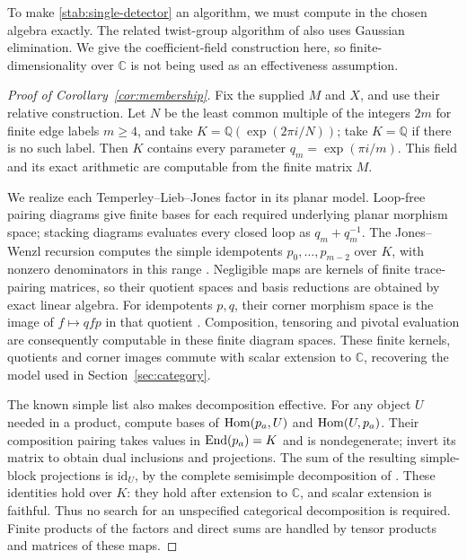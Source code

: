 To make \eqref{stab:single-detector} an algorithm, we must compute in the
chosen algebra exactly. The related twist-group algorithm of
\cite[Proposition~7.11]{HengLicata2024} also uses Gaussian elimination.
We give the coefficient-field construction here, so finite-dimensionality
over $\mathbb C$ is not being used as an effectiveness assumption.

\begin{proof}[Proof of Corollary~\ref{cor:membership}]
Fix the supplied $M$ and $X$, and use their relative construction.
Let $N$ be the least common multiple of the integers $2m$ for finite
edge labels $m\ge4$, and take $K=\mathbb Q(\exp(2\pi i/N))$; take
$K=\mathbb Q$ if there is no such label. Then $K$ contains every
parameter $q_m=\exp(\pi i/m)$. This field and its exact arithmetic are
computable from the finite matrix $M$.

We realize each Temperley--Lieb--Jones factor in its planar model.
Loop-free pairing diagrams give finite bases for each required underlying
planar morphism space; stacking diagrams evaluates every closed loop as $q_m+q_m^{-1}$.
The Jones--Wenzl recursion computes the simple idempotents
$p_0,\ldots,p_{m-2}$ over $K$, with nonzero denominators in this range
\cite[Definition~2.1.1, Remark~2.1.3, and Theorem~2.3.2]{Chen2014}.
Negligible maps are kernels of finite trace-pairing matrices, so their
quotient spaces and basis reductions are obtained by exact linear
algebra. For idempotents $p,q$, their corner morphism space is the image
of $f\mapsto qfp$ in that quotient
\cite[Definition~2.4.1, Lemma~2.4.3, and Definition~5.2.1]{Chen2014}.
Composition, tensoring and pivotal evaluation are consequently
computable in these finite diagram spaces. These finite kernels,
quotients and corner images commute with scalar extension to
$\mathbb C$, recovering the model used in Section~\ref{sec:category}.

The known simple list also makes decomposition effective. For any
object $U$ needed in a product, compute bases of
$\operatorname{Hom}(p_a,U)$ and $\operatorname{Hom}(U,p_a)$. Their composition pairing takes values
in $\operatorname{End}(p_a)=K$ and is nondegenerate; invert its matrix to obtain dual
inclusions and projections. The sum of the resulting simple-block
projections is $\mathrm{id}_U$, by the complete semisimple decomposition
of \cite[Theorems~5.4.4--5.4.5]{Chen2014}. These identities hold over
$K$: they hold after extension to $\mathbb C$, and scalar extension is
faithful. Thus no search for an unspecified categorical decomposition
is required. Finite products of the factors and direct sums are handled
by tensor products and matrices of these maps.


\end{proof}
